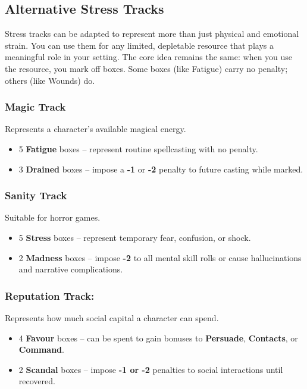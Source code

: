 \subsection{Alternative Stress Tracks}

Stress tracks can be adapted to represent more than just physical and emotional strain. You can use them for any limited, depletable resource that plays a meaningful role in your setting. The core idea remains the same: when you use the resource, you mark off boxes. Some boxes (like Fatigue) carry no penalty; others (like Wounds) do.

\subsubsection{Magic Track}
Represents a character’s available magical energy. 
    \begin{itemize}
        \item 5 \textbf{Fatigue} boxes – represent routine spellcasting with no penalty.
        \item 3 \textbf{Drained} boxes – impose a \textbf{-1} or \textbf{-2} penalty to future casting while marked.
    \end{itemize}

\subsubsection{Sanity Track}
Suitable for horror games. 
    \begin{itemize}
        \item 5 \textbf{Stress} boxes – represent temporary fear, confusion, or shock.
        \item 2 \textbf{Madness} boxes – impose \textbf{-2} to all mental skill rolls or cause hallucinations and narrative complications.
    \end{itemize}

\subsubsection{Reputation Track:} Represents how much social capital a character can spend. 
    \begin{itemize}
        \item 4 \textbf{Favour} boxes – can be spent to gain bonuses to \textbf{Persuade}, \textbf{Contacts}, or \textbf{Command}.
        \item 2 \textbf{Scandal} boxes – impose \textbf{-1 or -2} penalties to social interactions until recovered.
    \end{itemize}

